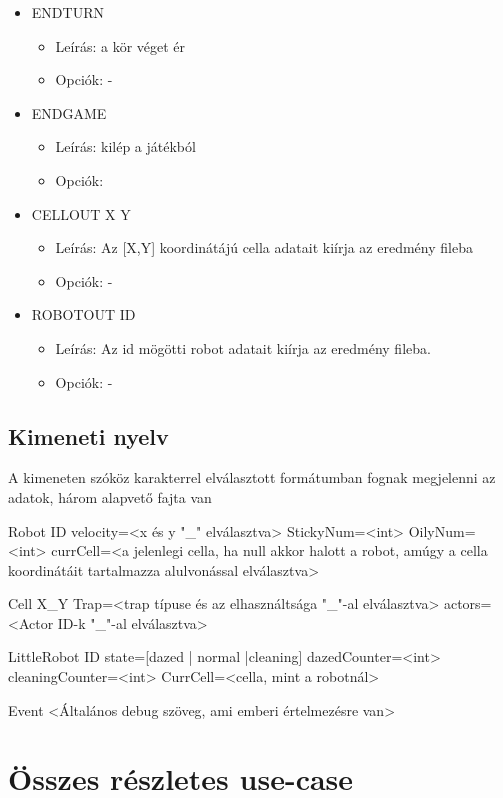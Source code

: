 \begin{itemize}
\item ENDTURN
\begin{itemize}
	\item Leírás: a kör véget ér
	\item Opciók: -
\end{itemize}


\item ENDGAME
\begin{itemize}
	\item Leírás: kilép a játékból
	\item Opciók:
\end{itemize}

\item CELLOUT X Y
\begin{itemize}
	\item Leírás: Az [X,Y] koordinátájú cella adatait kiírja az eredmény fileba
	\item Opciók: -
\end{itemize}

\item ROBOTOUT ID
\begin{itemize}
	\item Leírás: Az id mögötti robot adatait kiírja az eredmény fileba.
	\item Opciók: -
\end{itemize}

\end{itemize}

\subsection{Kimeneti nyelv}
A kimeneten szóköz karakterrel elválasztott formátumban fognak megjelenni az adatok, három alapvető fajta van

Robot ID velocity=<x és y "\_" elválasztva> StickyNum=<int> OilyNum=<int> currCell=<a jelenlegi cella, ha null akkor halott a robot, amúgy a cella koordinátáit tartalmazza alulvonással elválasztva>

Cell X\_Y Trap=<trap típuse és az elhasználtsága "\_"-al elválasztva> actors=<Actor ID-k "\_"-al elválasztva>

LittleRobot ID state=[dazed | normal |cleaning] dazedCounter=<int> cleaningCounter=<int> CurrCell=<cella, mint a robotnál>

Event <Általános debug szöveg, ami emberi értelmezésre van>

\section{Összes részletes use-case}


